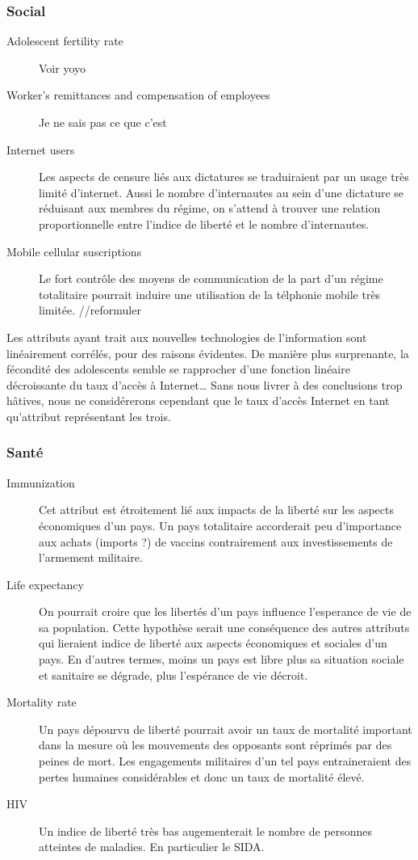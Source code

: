 \subsubsection{Social}
\begin{description}
\item [Adolescent fertility rate] 
Voir yoyo
\item [Worker's remittances and compensation of employees]
Je ne sais pas ce que c'est
\item [Internet users]
Les aspects de censure liés aux dictatures se traduiraient par un usage très limité d'internet. Aussi le nombre d'internautes 
au sein d'une dictature se réduisant aux membres du régime, on s'attend à trouver une relation proportionnelle entre l'indice de liberté et le nombre d'internautes. 
\item [Mobile cellular suscriptions]
Le fort contrôle des moyens de communication de la part d'un régime totalitaire pourrait induire une utilisation de la télphonie mobile très limitée. //reformuler
 
\end{description}

Les attributs ayant trait aux nouvelles technologies de l'information sont linéairement corrélés, pour des raisons évidentes. De manière plus surprenante, la fécondité des adolescents semble se rapprocher d'une fonction linéaire décroissante du taux d'accès à Internet\ldots
Sans nous livrer à des conclusions trop hâtives, nous ne considérerons cependant que le taux d'accès Internet en tant qu'attribut représentant les trois.

\subsubsection{Santé}
\begin{description}
\item [Immunization]
Cet attribut est étroitement lié aux impacts de la liberté sur les aspects économiques d'un pays. Un pays totalitaire
accorderait peu d'importance aux achats (imports ?) de vaccins contrairement aux investissements de l'armement militaire.
\item [Life expectancy]
On pourrait croire que les libertés d'un pays influence l'esperance de vie de sa population. Cette hypothèse serait une conséquence
des autres attributs qui lieraient indice de liberté aux aspects économiques et sociales d'un pays. En d'autres termes, moins un pays est libre plus sa situation sociale et sanitaire se dégrade, plus l'espérance de vie décroit.
\item [Mortality rate]
Un pays dépourvu de liberté pourrait avoir un taux de mortalité important dans la mesure où les mouvements des opposants sont réprimés par des peines de mort.
Les engagements militaires d'un tel pays entraineraient des pertes humaines considérables et donc un taux de mortalité élevé.
\item [HIV]
Un indice de liberté très bas augementerait le nombre de personnes atteintes de maladies. En particulier le SIDA.
\end{description}

